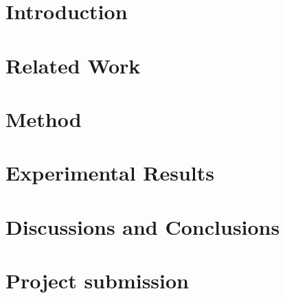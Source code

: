 \documentclass{article}
\begin{document}

\printAffiliationsAndNotice{}

\begin{abstract}
%
This is a \LaTeX template for writing your project report, to be submitted as part of the final exam. The template can not be modified (you can not change margins, spaces, etc.), and using this template is mandatory. Please read the main text for further details.
%
\end{abstract}


\section{Introduction}
\section{Related Work}
\section{Method}
\section{Experimental Results}
\section{Discussions and Conclusions}
\section{Project submission}
\end{document}
